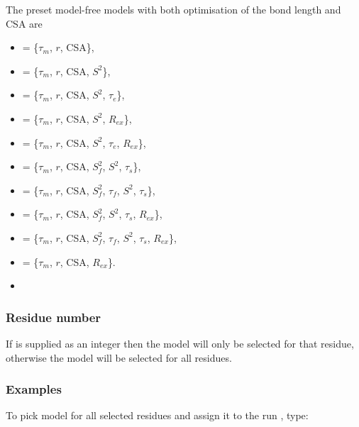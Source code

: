  The preset model-free models with both optimisation of the bond length and CSA are 
  

 \begin{itemize} 
 \item[]  = \{$\tau_m$, $r$, CSA\},  
 \item[]  = \{$\tau_m$, $r$, CSA, $S^2$\},  
 \item[]  = \{$\tau_m$, $r$, CSA, $S^2$, $\tau_e$\},  
 \item[]  = \{$\tau_m$, $r$, CSA, $S^2$, $R_{ex}$\},  
 \item[]  = \{$\tau_m$, $r$, CSA, $S^2$, $\tau_e$, $R_{ex}$\},  
 \item[]  = \{$\tau_m$, $r$, CSA, $S^2_f$, $S^2$, $\tau_s$\},  
 \item[]  = \{$\tau_m$, $r$, CSA, $S^2_f$, $\tau_f$, $S^2$, $\tau_s$\},  
 \item[]  = \{$\tau_m$, $r$, CSA, $S^2_f$, $S^2$, $\tau_s$, $R_{ex}$\},  
 \item[]  = \{$\tau_m$, $r$, CSA, $S^2_f$, $\tau_f$, $S^2$, $\tau_s$, $R_{ex}$\},  
 \item[]  = \{$\tau_m$, $r$, CSA, $R_{ex}$\}.  
 \item[]  
 \end{itemize} 
  

  
 \subsubsection{Residue number} 

 If  is supplied as an integer then the model will only be selected for that residue, otherwise the model will be selected for all residues. 
  

  
 \subsubsection{Examples} 

 To pick model  for all selected residues and assign it to the run , type: 
  



